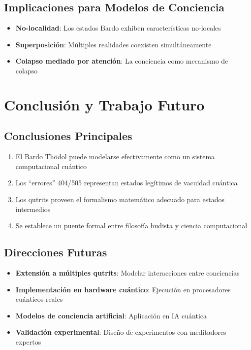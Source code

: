 \documentclass[12pt,a4paper]{article}
\theoremstyle{definition}
\begin{document}
\subsection{Implicaciones para Modelos de Conciencia}

\begin{itemize}
    \item \textbf{No-localidad}: Los estados Bardo exhiben características no-locales
    \item \textbf{Superposición}: Múltiples realidades coexisten simultáneamente
    \item \textbf{Colapso mediado por atención}: La conciencia como mecanismo de colapso
\end{itemize}

\section{Conclusión y Trabajo Futuro}

\subsection{Conclusiones Principales}

\begin{enumerate}
    \item El Bardo Thödol puede modelarse efectivamente como un sistema computacional cuántico
    \item Los ``errores'' 404/505 representan estados legítimos de vacuidad cuántica
    \item Los qutrits proveen el formalismo matemático adecuado para estados intermedios
    \item Se establece un puente formal entre filosofía budista y ciencia computacional
\end{enumerate}

\subsection{Direcciones Futuras}

\begin{itemize}
    \item \textbf{Extensión a múltiples qutrits}: Modelar interacciones entre conciencias
    \item \textbf{Implementación en hardware cuántico}: Ejecución en procesadores cuánticos reales
    \item \textbf{Modelos de conciencia artificial}: Aplicación en IA cuántica
    \item \textbf{Validación experimental}: Diseño de experimentos con meditadores expertos
\end{itemize}
\end{document}

